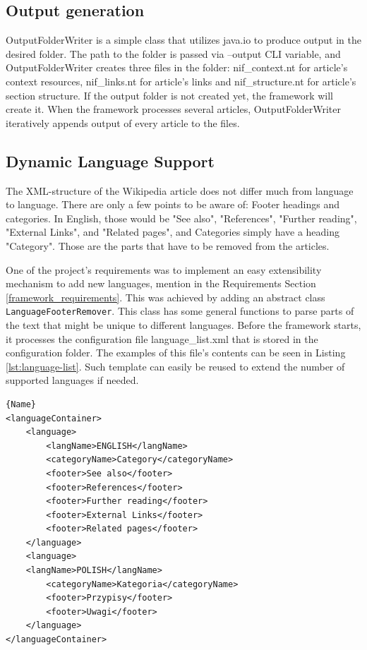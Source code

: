 \documentclass[thesis=M,english,hidelinks]{FITthesis}[2019/12/23]
\begin{document}
\subsection{Output generation}

OutputFolderWriter is a simple class that utilizes java.io to produce output in the desired folder. The path to the folder is passed via --output CLI variable, and OutputFolderWriter creates three files in the folder: nif\_context.nt for article's context resources, nif\_links.nt for article's links and nif\_structure.nt for article's section structure. If the output folder is not created yet, the framework will create it. When the framework processes several articles, OutputFolderWriter iteratively appends output of every article to the files.

\subsection{Dynamic Language Support}\label{dynamic_lang_support}

The XML-structure of the Wikipedia article does not differ much from language to language. There are only a few points to be aware of: Footer headings and categories. In English, those would be "See also", "References", "Further reading", "External Links", and "Related pages", and Categories simply have a heading "Category". Those are the parts that have to be removed from the articles.

One of the project's requirements was to implement an easy extensibility mechanism to add new languages, mention in the Requirements Section \ref{framework_requirements}. This was achieved by adding an abstract class \lstinline{LanguageFooterRemover}. This class has some general functions to parse parts of the text that might be unique to different languages. Before the framework starts, it processes the configuration file language\_list.xml that is stored in the configuration folder. The examples of this file's contents can be seen in Listing \ref{lst:language-list}. Such template can easily be reused to extend the number of supported languages if needed.

\begin{lstlisting}[caption=Example of an language configuration file,frame=tlrb,  label = {lst:language-list}]{Name}
<languageContainer>
	<language>
		<langName>ENGLISH</langName>
		<categoryName>Category</categoryName>
		<footer>See also</footer>
		<footer>References</footer>
		<footer>Further reading</footer>
		<footer>External Links</footer>
		<footer>Related pages</footer>
	</language>
	<language>
	<langName>POLISH</langName>
		<categoryName>Kategoria</categoryName>
		<footer>Przypisy</footer>
		<footer>Uwagi</footer>
	</language>
</languageContainer>
\end{lstlisting}
\end{document}
